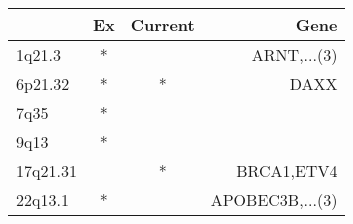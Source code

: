 \begin{tabular}{lccr}
\toprule
{} & Ex & Current &             Gene \\
\midrule
1q21.3   &  * &         &      ARNT,...(3) \\
6p21.32  &  * &       * &             DAXX \\
7q35     &  * &         &                  \\
9q13     &  * &         &                  \\
17q21.31 &    &       * &       BRCA1,ETV4 \\
22q13.1  &  * &         &  APOBEC3B,...(3) \\
\bottomrule
\end{tabular}
